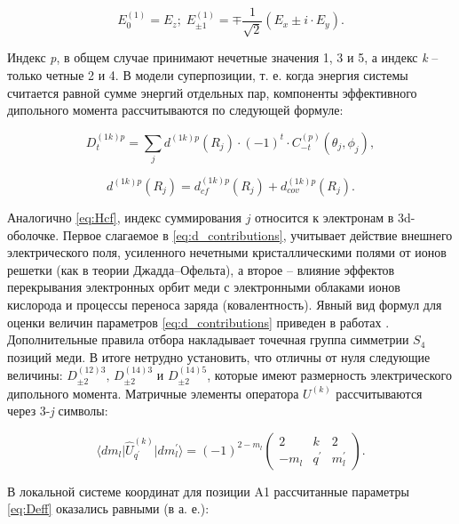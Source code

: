 \begin{equation}
	\label{eq:electricalComponents}
	E_{0}^{(1)} = E_z; \; E_{\pm 1}^{(1)} = \mp \frac{1}{\sqrt{2}} (E_x \pm i \cdot E_y).
\end{equation}

Индекс \textit{p}, в общем случае принимают нечетные значения 1, 3 и 5, а индекс \textit{k} – только четные 2 и 4. В модели суперпозиции, т. е. когда энергия системы считается равной сумме энергий отдельных пар, компоненты эффективного дипольного момента рассчитываются по следующей формуле:

\begin{equation}
	\label{eq:Deff}
	D^{(1k)p}_{t} = \sum_{j} d^{(1k)p}(R_j) \cdot (-1)^t \cdot C^{(p)}_{-t}(\theta_j,\phi_j),
\end{equation}

\begin{equation}
	\label{eq:d_contributions}
	d^{(1k)p}(R_j) = d^{(1k)p}_{cf}(R_j) + d^{(1k)p}_{cov}(R_j).
\end{equation}

Аналогично \cref{eq:Hcf}, индекс суммирования $j$ относится к электронам в 3d-оболочке. Первое слагаемое в \cref{eq:d_contributions}, учитывает действие внешнего электрического поля, усиленного нечетными кристаллическими полями от ионов решетки (как в теории Джадда--Офельта), а второе – влияние эффектов перекрывания электронных орбит меди с электронными облаками ионов кислорода и процессы переноса заряда (ковалентность). Явный вид формул для оценки величин параметров \cref{eq:d_contributions} приведен в работах \cite{Kornienko1977, Eremin2019jetp}.
Дополнительные правила отбора накладывает точечная группа симметрии $S_4$ позиций меди. В итоге нетрудно установить, что отличны от нуля следующие величины: $D_{\pm 2}^{(12)3}, \, D_{\pm 2}^{(14)3} \text{ и } D_{\pm 2}^{(14)5}$, которые имеют размерность электрического дипольного момента. Матричные элементы оператора $U^{(k)}$ рассчитываются через 3-\textit{j} символы:

\begin{equation}
	\label{eq:MatrixU}
	\langle dm_l \lvert \hat{U}_{q^\prime}^{(k)} \rvert dm_l^\prime \rangle = (-1)^{2-m_l} 
	\begin{pmatrix}
		2 & k & 2 \\
		-m_l & q^\prime & m_l^\prime
	\end{pmatrix}.
\end{equation}

В локальной системе координат для позиции A1 рассчитанные параметры \cref{eq:Deff} оказались равными (в а. е.):

